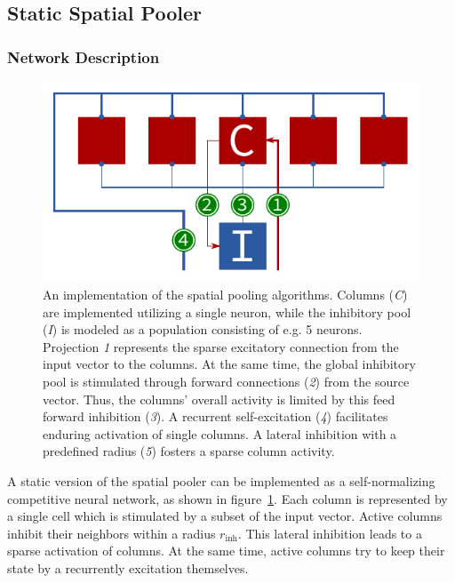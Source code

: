 \subsection{Static Spatial Pooler}

\subsubsection{Network Description}

\begin{figure}
	\begin{center}
		\includegraphics{../circuitry/spatial_pooler.pdf}
	\end{center}
	\caption{An implementation of the spatial pooling algorithms. Columns (\emph{C}) are implemented utilizing a single neuron, while the inhibitory pool (\emph{I}) is modeled as a population consisting of e.g. 5 neurons. Projection \emph{1} represents the sparse excitatory connection from the input vector to the columns. At the same time, the global inhibitory pool is stimulated through forward connections (\emph{2}) from the source vector. Thus, the columns' overall activity is limited by this feed forward inhibition (\emph{3}). A recurrent self-excitation (\emph{4}) facilitates enduring activation of single columns. A lateral inhibition with a predefined radius (\emph{5}) fosters a sparse column activity.}
	\label{fig:static_spatial_pooler}
\end{figure}

A static version of the spatial pooler can be implemented as a self-normalizing competitive neural network, as shown in figure~\ref{fig:static_spatial_pooler}. Each column is represented by a single cell which is stimulated by a subset of the input vector. Active columns inhibit their neighbors within a radius $r_\text{inh}$. This lateral inhibition leads to a sparse activation of columns. At the same time, active columns try to keep their state by a recurrently excitation themselves.

